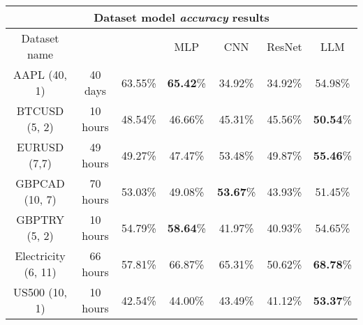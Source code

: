 \begin{center}
	\begin{tabular}{|| c || c | c | c | c | c | c ||}
		\hline
		\multicolumn{7}{|c|}{Dataset model \emph{accuracy} results}                                                                                                                                          \\
		\hline
		Dataset name        & \vtop{\hbox{\strut Prediction}\hbox{\strut timestep}} & \vtop{\hbox{\strut Linear}\hbox{\strut Regression}} & MLP              & CNN              & ResNet  & LLM              \\ [0.5ex]
		\hline\hline
		AAPL (40, 1)        & 40 days                                               & 63.55\%                                             & \textbf{65.42}\% & 34.92\%          & 34.92\% & 54.98\%          \\
		\hline
		BTCUSD (5, 2)       & 10 hours                                              & 48.54\%                                             & 46.66\%          & 45.31\%          & 45.56\% & \textbf{50.54}\% \\
		\hline
		EURUSD (7,7)        & 49 hours                                              & 49.27\%                                             & 47.47\%          & 53.48\%          & 49.87\% & \textbf{55.46}\% \\
		\hline
		GBPCAD (10, 7)      & 70 hours                                              & 53.03\%                                             & 49.08\%          & \textbf{53.67}\% & 43.93\% & 51.45\%          \\
		\hline
		GBPTRY (5, 2)       & 10 hours                                              & 54.79\%                                             & \textbf{58.64}\% & 41.97\%          & 40.93\% & 54.65\%          \\
		\hline
		Electricity (6, 11) & 66 hours                                              & 57.81\%                                             & 66.87\%          & 65.31\%          & 50.62\% & \textbf{68.78}\% \\
		\hline
		US500 (10, 1)       & 10 hours                                              & 42.54\%                                             & 44.00\%          & 43.49\%          & 41.12\% & \textbf{53.37}\% \\
		\hline

		\hline
	\end{tabular}
\end{center}


